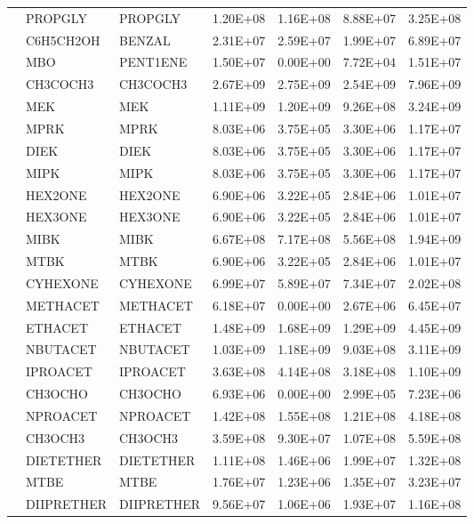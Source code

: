 \begin{longtable}{lllllll}
	 & PROPGLY & PROPGLY & 1.20E+08 & 1.16E+08 & 8.88E+07 & 3.25E+08 \\
	 & C6H5CH2OH & BENZAL & 2.31E+07 & 2.59E+07 & 1.99E+07 & 6.89E+07 \\
	 & MBO & PENT1ENE & 1.50E+07 & 0.00E+00 & 7.72E+04 & 1.51E+07 \\
	\hline \parbox[t]{2mm}{} & CH3COCH3 & CH3COCH3 & 2.67E+09 & 2.75E+09 & 2.54E+09 & 7.96E+09 \\
	 & MEK & MEK & 1.11E+09 & 1.20E+09 & 9.26E+08 & 3.24E+09 \\
	 & MPRK & MPRK & 8.03E+06 & 3.75E+05 & 3.30E+06 & 1.17E+07 \\
	 & DIEK & DIEK & 8.03E+06 & 3.75E+05 & 3.30E+06 & 1.17E+07 \\
	 & MIPK & MIPK & 8.03E+06 & 3.75E+05 & 3.30E+06 & 1.17E+07 \\
	 & HEX2ONE & HEX2ONE & 6.90E+06 & 3.22E+05 & 2.84E+06 & 1.01E+07 \\
	 & HEX3ONE & HEX3ONE & 6.90E+06 & 3.22E+05 & 2.84E+06 & 1.01E+07 \\
	 & MIBK & MIBK & 6.67E+08 & 7.17E+08 & 5.56E+08 & 1.94E+09 \\
	 & MTBK & MTBK & 6.90E+06 & 3.22E+05 & 2.84E+06 & 1.01E+07 \\
	 & CYHEXONE & CYHEXONE & 6.99E+07 & 5.89E+07 & 7.34E+07 & 2.02E+08 \\
	\hline \parbox[t]{2mm}{} & METHACET & METHACET & 6.18E+07 & 0.00E+00 & 2.67E+06 & 6.45E+07 \\
	 & ETHACET & ETHACET & 1.48E+09 & 1.68E+09 & 1.29E+09 & 4.45E+09 \\
	 & NBUTACET & NBUTACET & 1.03E+09 & 1.18E+09 & 9.03E+08 & 3.11E+09 \\
	 & IPROACET & IPROACET & 3.63E+08 & 4.14E+08 & 3.18E+08 & 1.10E+09 \\
	 & CH3OCHO & CH3OCHO & 6.93E+06 & 0.00E+00 & 2.99E+05 & 7.23E+06 \\
	 & NPROACET & NPROACET & 1.42E+08 & 1.55E+08 & 1.21E+08 & 4.18E+08 \\
	\hline \parbox[t]{2mm}{} & CH3OCH3 & CH3OCH3 & 3.59E+08 & 9.30E+07 & 1.07E+08 & 5.59E+08 \\*
	 & DIETETHER & DIETETHER & 1.11E+08 & 1.46E+06 & 1.99E+07 & 1.32E+08 \\*
	 & MTBE & MTBE & 1.76E+07 & 1.23E+06 & 1.35E+07 & 3.23E+07 \\
	 & DIIPRETHER & DIIPRETHER & 9.56E+07 & 1.06E+06 & 1.93E+07 & 1.16E+08 \\

\end{longtable}
